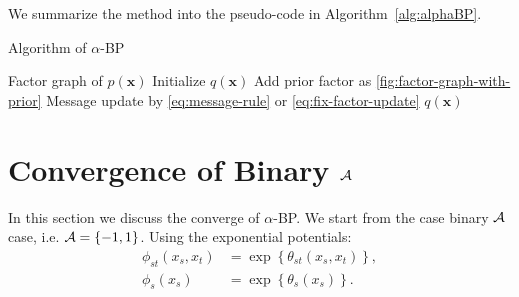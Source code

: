 \documentclass[conference,onecolumn]{IEEEtran}
\begin{document}
We summarize the method into the pseudo-code in Algorithm~\autoref{alg:alphaBP}.
\begin{algorithm}
  \caption{Algorithm of $\alpha$-BP}\label{alg:alphaBP}
  \begin{algorithmic}[1]
    \renewcommand{\algorithmicrequire}{\textbf{Input:}}
    \renewcommand{\algorithmicensure}{\textbf{Output:}}
    \REQUIRE Factor graph of $p(\bm{x})$
    \STATE Initialize $q(\bm{x})$
    \STATE Add prior factor as \autoref{fig:factor-graph-with-prior}
    \ENDIF
    \STATE Message update by \autoref{eq:message-rule} or \autoref{eq:fix-factor-update}
    \ENDFOR
    \ENDWHILE
    \RETURN $q(\bm{x})$ 
  \end{algorithmic} 
\end{algorithm}

\section{Convergence of Binary $\mathcal{A}$}
In this section we discuss the converge of $\alpha$-BP. We start from the case binary $\mathcal{A}$ case, i.e. $\mathcal{A}=\left\{ -1, 1 \right\}$. Using the exponential potentials:
\begin{align}
  \phi_{st}(x_s, x_t) &= \exp\left\{ \theta_{st}(x_s, x_t)\right\}, \\
  \phi_{s}(x_s) &= \exp\left\{ \theta_{s}(x_s) \right\}.
\end{align}
\end{document}
